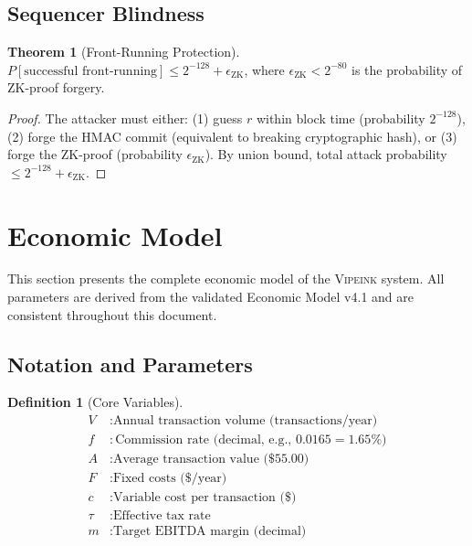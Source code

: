 \documentclass[12pt,a4paper]{article}
\theoremstyle{definition}
\newtheorem{definition}{Definition}[section]
\newtheorem{theorem}{Theorem}[section]
\theoremstyle{remark}
\newcommand{\Vipeink}{\textsc{Vipeink}}
\newcommand{\USD}[1]{\$#1}
\begin{document}
\subsection{Sequencer Blindness}

\begin{theorem}[Front-Running Protection]
\label{thm:frontrunning}
$P[\text{successful front-running}] \leq 2^{-128} + \epsilon_{\text{ZK}}$, where $\epsilon_{\text{ZK}} < 2^{-80}$ is the probability of ZK-proof forgery.
\end{theorem}

\begin{proof}
The attacker must either: (1) guess $r$ within block time (probability $2^{-128}$), (2) forge the HMAC commit (equivalent to breaking cryptographic hash), or (3) forge the ZK-proof (probability $\epsilon_{\text{ZK}}$). By union bound, total attack probability $\leq 2^{-128} + \epsilon_{\text{ZK}}$.
\end{proof}


\section{Economic Model}
\label{sec:economic-model}

This section presents the complete economic model of the \Vipeink{} system. All parameters are derived from the validated Economic Model v4.1 and are consistent throughout this document.

\subsection{Notation and Parameters}

\begin{definition}[Core Variables]
\begin{align*}
V &: \text{Annual transaction volume (transactions/year)} \\
f &: \text{Commission rate (decimal, e.g., } 0.0165 = 1.65\%) \\
A &: \text{Average transaction value (\USD{55.00})} \\
F &: \text{Fixed costs (\USD{}/year)} \\
c &: \text{Variable cost per transaction (\USD{})} \\
\tau &: \text{Effective tax rate} \\
m &: \text{Target EBITDA margin (decimal)}
\end{align*}
\end{definition}
\end{document}
